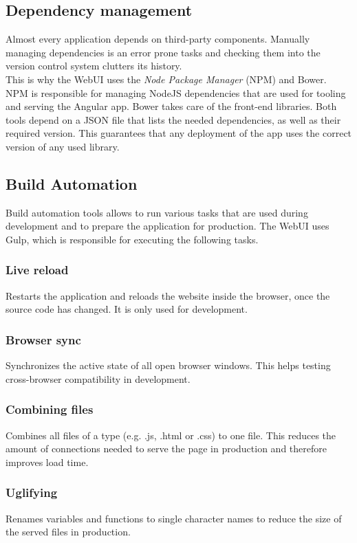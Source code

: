 \subsection{Dependency management}
Almost every application depends on third-party components. Manually managing dependencies is an error prone tasks and checking them into the version control system clutters its history.\\
This is why the WebUI uses the \textit{Node Package Manager} (NPM) and Bower. NPM is responsible for managing NodeJS dependencies that are used for tooling and serving the Angular app. Bower takes care of the front-end libraries. Both tools depend on a JSON file that lists the needed dependencies, as well as their required version. This guarantees that any deployment of the app uses the correct version of any used library.


\subsection{Build Automation}
Build automation tools allows to run various tasks that are used during development and to prepare the application for production. The WebUI uses Gulp, which is responsible for executing the following tasks.

\subsubsection{Live reload} Restarts the application and reloads the website inside the browser, once the source code has changed. It is only used for development.

\subsubsection{Browser sync} Synchronizes the active state of all open browser windows. This helps testing cross-browser compatibility in development.

\subsubsection{Combining files} Combines all files of a type (e.g. .js, .html or .css) to one file. This reduces the amount of connections needed to serve the page in production and therefore improves load time.

\subsubsection{Uglifying} Renames variables and functions to single character names to reduce the size of the served files in production.

